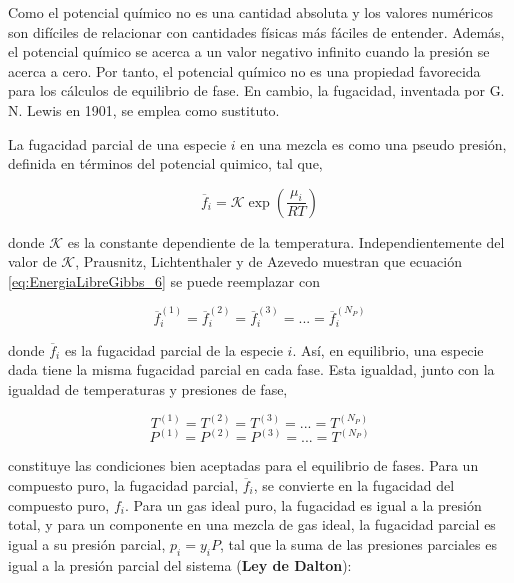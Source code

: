 \documentclass[11pt]{book}
\begin{document}
Como el potencial químico no es una cantidad absoluta y los valores numéricos son difíciles de relacionar con cantidades físicas más fáciles de entender. Además, el potencial químico se acerca a un valor negativo infinito cuando la presión se acerca a cero. Por tanto, el potencial químico no es una propiedad favorecida para los cálculos de equilibrio de fase. En cambio, la fugacidad, inventada por G. N. Lewis en 1901, se emplea como sustituto.

La fugacidad parcial de una especie $i$ en una mezcla es como una pseudo presión, definida en términos del potencial quimico, tal que,

\begin{equation}
    \label{eq:PotencialQuimico_Fugacidad_1}
    \overline{f}_i = \mathcal{K} \exp \left( \frac{\mu_i}{RT} \right)
\end{equation}

donde $\mathcal{K}$ es la constante dependiente de la temperatura. Independientemente del valor de $\mathcal{K}$, Prausnitz, Lichtenthaler y de Azevedo muestran que ecuación \ref{eq:EnergiaLibreGibbs_6} se puede reemplazar con

\begin{equation}
    \label{eq:PotencialQuimico_Fugacidad_2}
    \overline{f}_i^{(1)} = \overline{f}_i^{(2)} = \overline{f}_i^{(3)} = ... = \overline{f}_i^{(N_P)}
\end{equation}

donde $\overline{f}_i$ es la fugacidad parcial de la especie $i$. Así, en equilibrio, una especie dada tiene la misma fugacidad parcial en cada fase. Esta igualdad, junto con la igualdad de temperaturas y presiones de fase,

\begin{equation}
    \label{eq:PotencialQuimico_Fugacidad_3}
    T^{(1)} = T^{(2)} = T^{(3)} = ... = T^{(N_P)}
\end{equation}
\begin{equation}
    \label{eq:PotencialQuimico_Fugacidad_4}
    P^{(1)} = P^{(2)} = P^{(3)} = ... = T^{(N_P)}
\end{equation}

constituye las condiciones bien aceptadas para el equilibrio de fases. Para un compuesto puro, la fugacidad parcial, $\overline{f}_i$, se convierte en la fugacidad del compuesto puro, $f_i$. Para un gas ideal puro, la fugacidad es igual a la presión total, y para un componente en una mezcla de gas ideal, la fugacidad parcial es igual a su presión parcial, $p_i = y_i P$, tal que la suma de las presiones parciales es igual a la presión parcial del sistema (\textbf{Ley de Dalton}):
\end{document}
